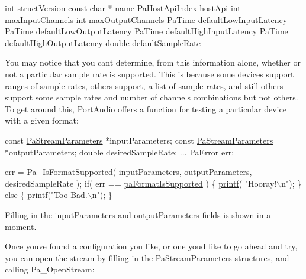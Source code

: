 \begin{DoxyCode}
\textcolor{keywordtype}{int}     structVersion
\textcolor{keyword}{const} \textcolor{keywordtype}{char} *    \hyperlink{lib_2expat_8h_a1b49b495b59f9e73205b69ad1a2965b0}{name}
\hyperlink{portaudio_8h_aeef6da084c57c70aa94be97411e19930}{PaHostApiIndex}  hostApi
\textcolor{keywordtype}{int}     maxInputChannels
\textcolor{keywordtype}{int}     maxOutputChannels
\hyperlink{portaudio_8h_af17a7e6d0471a23071acf8dbd7bbe4bd}{PaTime}  defaultLowInputLatency
\hyperlink{portaudio_8h_af17a7e6d0471a23071acf8dbd7bbe4bd}{PaTime}  defaultLowOutputLatency
\hyperlink{portaudio_8h_af17a7e6d0471a23071acf8dbd7bbe4bd}{PaTime}  defaultHighInputLatency
\hyperlink{portaudio_8h_af17a7e6d0471a23071acf8dbd7bbe4bd}{PaTime}  defaultHighOutputLatency
\textcolor{keywordtype}{double}  defaultSampleRate
\end{DoxyCode}


You may notice that you can\textquotesingle{}t determine, from this information alone, whether or not a particular sample rate is supported. This is because some devices support ranges of sample rates, others support, a list of sample rates, and still others support some sample rates and number of channels combinations but not others. To get around this, Port\+Audio offers a function for testing a particular device with a given format\+:


\begin{DoxyCode}
\textcolor{keyword}{const} \hyperlink{struct_pa_stream_parameters}{PaStreamParameters} *inputParameters;
\textcolor{keyword}{const} \hyperlink{struct_pa_stream_parameters}{PaStreamParameters} *outputParameters;
\textcolor{keywordtype}{double} desiredSampleRate;
...
PaError err;

err = \hyperlink{portaudio_8h_abdb313743d6efef26cecdae787a2bd3d}{Pa\_IsFormatSupported}( inputParameters, outputParameters, desiredSampleRate );
\textcolor{keywordflow}{if}( err == \hyperlink{portaudio_8h_a400df642339bf4112333060af6a43c0f}{paFormatIsSupported} )
\{
   \hyperlink{octave__test_8m_ac6d0e62c65e5715b13a5fcb381118888}{printf}( \textcolor{stringliteral}{"Hooray!\(\backslash\)n"});
\}
\textcolor{keywordflow}{else}
\{
   \hyperlink{octave__test_8m_ac6d0e62c65e5715b13a5fcb381118888}{printf}(\textcolor{stringliteral}{"Too Bad.\(\backslash\)n"});
\}
\end{DoxyCode}


Filling in the input\+Parameters and output\+Parameters fields is shown in a moment.

Once you\textquotesingle{}ve found a configuration you like, or one you\textquotesingle{}d like to go ahead and try, you can open the stream by filling in the \hyperlink{struct_pa_stream_parameters}{Pa\+Stream\+Parameters} structures, and calling Pa\+\_\+\+Open\+Stream\+:


